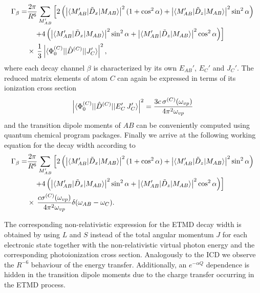 \begin{align} \label{reltheolifetimeetmd}
 \Gamma_\beta =& \frac{2\pi}{R^6} \sum\limits_{M_{AB}'} \left[ 2\left( \left|
                 \braket{M_{AB}'| \tilde{D}_x |M_{AB}} \right|^2 (1+  \cos^2\alpha)
                 + \left|\braket{M_{AB}'| \tilde{D}_z |M_{AB}}\right|^2 \sin^2\alpha \right) \right. \nonumber \\
           & \quad\left.+ 4 \left( \left|\braket{M_{AB}'| \tilde{D}_x |M_{AB}}
             \right|^2\sin^2\alpha
             + \left|\braket{M_{AB}'| \tilde{D}_z |M_{AB}}\right|^2\cos^2\alpha \right)  \right] \nonumber\\ 
           & \times\, \frac 13  \left| \braket{\Phi_0^{(C)} || \hat{D}^{(C)} ||J'_C} \right|^2
         ,
\end{align}
where each decay channel $\beta$ is characterized by its own $E_{AB}'$, $E_C'$
and $J_C'$. The reduced matrix elements of atom $C$ can again be expressed in
terms of its ionization cross section
\begin{equation}\label{mecross}
  \left| \braket{\Phi_0^{(C)} || \hat{D}^{(C)} || E'_{C}\, J'_{C}} \right|^2
   = \frac{3c\,\sigma^{(C)}(\omega_{vp})}{4\pi^2\omega_{vp}} 
\end{equation}
and the transition dipole moments of $AB$ can be conveniently computed
using quantum chemical program packages.
Finally we arrive at the following working equation for the decay
width according to
\begin{align} \label{reltheolifetimeetmd_exp}
 \Gamma_\beta =& \frac{2\pi}{R^6} \sum\limits_{M_{AB}'} \left[ 2\left( \left| \braket{M_{AB}'| \tilde{D}_x |M_{AB}} \right|^2 (1+ \cos^2\alpha) + \left|\braket{M_{AB}'| \tilde{D}_z |M_{AB}}\right|^2 \sin^2\alpha \right) \right. \nonumber \\
           & \quad\left.+ 4 \left( \left|\braket{M_{AB}'| \tilde{D}_x |M_{AB}}\right|^2\sin^2\alpha + \left|\braket{M_{AB}'| \tilde{D}_z |M_{AB}}\right|^2\cos^2\alpha \right)  \right] \nonumber \\ 
           & \times\, \frac{c\sigma^{(C)}(\omega_{vp})}{4\pi^2 \omega_{vp}}
           \delta (\omega_{AB}-\omega_C) .
\end{align}

The corresponding non-relativistic expression for the ETMD decay width is
obtained by using $L$ and $S$ instead of the total angular momentum $J$ for
each electronic state together with the non-relativistic virtual photon
energy and the corresponding photoionization cross section. Analogously to
the ICD we observe the $R^{-6}$ behaviour of the energy transfer.
Additionally, an $e^{-\alpha Q}$ dependence is hidden in the transition
dipole moments due to the charge transfer occurring in the ETMD process.


